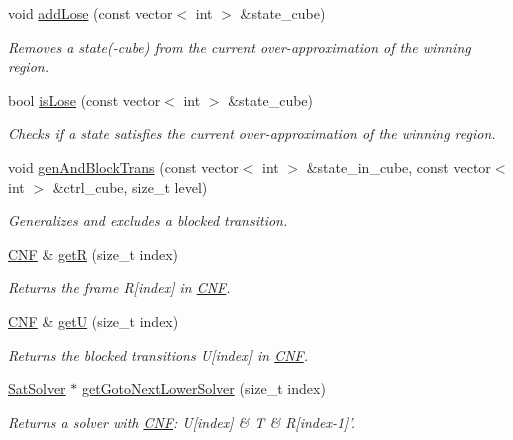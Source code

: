 \begin{DoxyCompactItemize}
void \hyperlink{classIFM13Explorer_a14c5ca206f19c7c741f63e43d1470387}{add\-Lose} (const vector$<$ int $>$ \&state\-\_\-cube)
\begin{DoxyCompactList}\small\item\em Removes a state(-\/cube) from the current over-\/approximation of the winning region. \end{DoxyCompactList}\item 
bool \hyperlink{classIFM13Explorer_af41ec86ed26940c59adc7d74c6ad5abc}{is\-Lose} (const vector$<$ int $>$ \&state\-\_\-cube)
\begin{DoxyCompactList}\small\item\em Checks if a state satisfies the current over-\/approximation of the winning region. \end{DoxyCompactList}\item 
void \hyperlink{classIFM13Explorer_a6607ae52fd8a14d5f3d54132f11406d3}{gen\-And\-Block\-Trans} (const vector$<$ int $>$ \&state\-\_\-in\-\_\-cube, const vector$<$ int $>$ \&ctrl\-\_\-cube, size\-\_\-t level)
\begin{DoxyCompactList}\small\item\em Generalizes and excludes a blocked transition. \end{DoxyCompactList}\item 
\hyperlink{classCNF}{C\-N\-F} \& \hyperlink{classIFM13Explorer_a75a0b20fe6d76b6d1fa52d447fa24d10}{get\-R} (size\-\_\-t index)
\begin{DoxyCompactList}\small\item\em Returns the frame R\mbox{[}index\mbox{]} in \hyperlink{classCNF}{C\-N\-F}. \end{DoxyCompactList}\item 
\hyperlink{classCNF}{C\-N\-F} \& \hyperlink{classIFM13Explorer_a2816b4c9f2cb02958e660a872f43fe4b}{get\-U} (size\-\_\-t index)
\begin{DoxyCompactList}\small\item\em Returns the blocked transitions U\mbox{[}index\mbox{]} in \hyperlink{classCNF}{C\-N\-F}. \end{DoxyCompactList}\item 
\hyperlink{classSatSolver}{Sat\-Solver} $\ast$ \hyperlink{classIFM13Explorer_abdf350f2df8a77579df3da7ecb3de8e4}{get\-Goto\-Next\-Lower\-Solver} (size\-\_\-t index)
\begin{DoxyCompactList}\small\item\em Returns a solver with \hyperlink{classCNF}{C\-N\-F}\-: U\mbox{[}index\mbox{]} \& T \& R\mbox{[}index-\/1\mbox{]}'. \end{DoxyCompactList}\item 

\end{DoxyCompactItemize}
